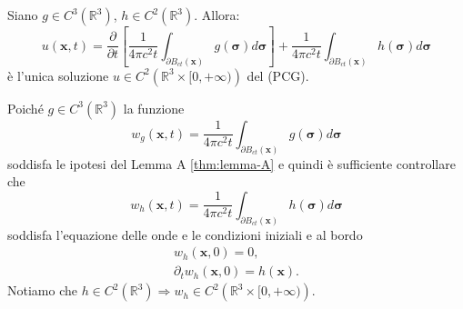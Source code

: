 \documentclass[10pt,a4paper,twoside,openright]{book}
\newcommand{\x}{\mathbf{x}}
\begin{document}
\begin{theorem}
	 Siano $\displaystyle g\in C^{3}\left(\mathbb{R}^{3}\right)$, $\displaystyle h\in C^{2}\left(\mathbb{R}^{3}\right)$. Allora:
	\begin{equation}
		u(\x ,t) =\frac{\partial }{\partial t}\left[\frac{1}{4\pi c^{2} t}\int _{\partial B_{ct}(\x)} g(\bm{\sigma }) d\bm{\sigma }\right] +\frac{1}{4\pi c^{2} t}\int _{\partial B_{ct}(\x)} h(\bm{\sigma }) d\bm{\sigma }
	\end{equation}
	è l'unica soluzione $\displaystyle u\in C^{2}\left(\mathbb{R}^{3} \times [ 0,+\infty )\right)$ del (PCG).
\end{theorem}
\begin{dimostrazione}
	Poiché $\displaystyle g\in C^{3}\left(\mathbb{R}^{3}\right)$ la funzione
	\begin{equation*}
		w_{g}(\x ,t) =\frac{1}{4\pi c^{2} t}\int _{\partial B_{ct}(\x)} g(\bm{\sigma }) d\bm{\sigma }
	\end{equation*}
	soddisfa le ipotesi del Lemma A \ref{thm:lemma-A} e quindi è sufficiente controllare che
	\begin{equation*}
		w_{h}(\x ,t) =\frac{1}{4\pi c^{2} t}\int _{\partial B_{ct}(\x)} h(\bm{\sigma }) d\bm{\sigma }
	\end{equation*}
	soddisfa l'equazione delle onde e le condizioni iniziali e al bordo
	\begin{gather*}
		w_{h}(\x ,0) =0,\\
		\partial _{t} w_{h}(\x ,0) =h(\x) .
	\end{gather*}
	Notiamo che $\displaystyle h\in C^{2}\left(\mathbb{R}^{3}\right) \Rightarrow w_{h} \in C^{2}\left(\mathbb{R}^{3} \times [ 0,+\infty )\right)$.


\end{dimostrazione}
\end{document}
